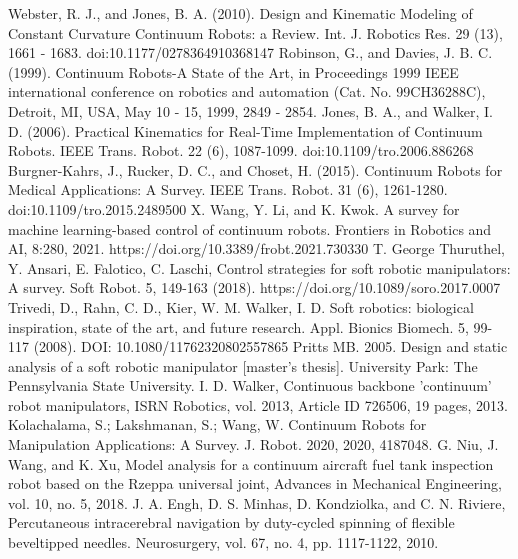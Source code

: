 \documentclass[12pt,twoside,a4]{mwbk}
\begin{document}
\begin{thebibliography}{9}
 Webster, R. J., and Jones, B. A. (2010). Design and Kinematic Modeling of Constant Curvature Continuum Robots: a Review. Int. J. Robotics Res. 29 (13), 1661 - 1683. doi:10.1177/0278364910368147
 Robinson, G., and Davies, J. B. C. (1999). Continuum Robots-A State of the Art, in Proceedings 1999 IEEE international conference on robotics and automation (Cat. No. 99CH36288C), Detroit, MI, USA, May 10 - 15, 1999, 2849 - 2854.
 Jones, B. A., and Walker, I. D. (2006). Practical Kinematics for Real-Time Implementation of Continuum Robots. IEEE Trans. Robot. 22 (6), 1087-1099. doi:10.1109/tro.2006.886268
 Burgner-Kahrs, J., Rucker, D. C., and Choset, H. (2015). Continuum Robots for Medical Applications: A Survey. IEEE Trans. Robot. 31 (6), 1261-1280. doi:10.1109/tro.2015.2489500
 X. Wang, Y. Li, and K. Kwok. A survey for machine learning-based control of continuum robots. Frontiers in Robotics and AI, 8:280, 2021. https://doi.org/10.3389/frobt.2021.730330
 T. George Thuruthel, Y. Ansari, E. Falotico, C. Laschi, Control strategies for soft robotic manipulators: A survey. Soft Robot. 5, 149-163 (2018). https://doi.org/10.1089/soro.2017.0007
 Trivedi, D., Rahn, C. D., Kier, W. M. Walker, I. D. Soft robotics: biological inspiration, state of the art, and future research. Appl. Bionics Biomech. 5, 99-117 (2008). DOI: 10.1080/11762320802557865
 Pritts MB. 2005. Design and static analysis of a soft robotic manipulator [master's thesis]. University Park: The Pennsylvania State University.
 I. D. Walker, Continuous backbone 'continuum' robot manipulators, ISRN Robotics, vol. 2013, Article ID 726506, 19 pages, 2013.
 Kolachalama, S.; Lakshmanan, S.; Wang, W. Continuum Robots for Manipulation Applications: A Survey. J. Robot. 2020, 2020, 4187048.
 G. Niu, J. Wang, and K. Xu, Model analysis for a continuum aircraft fuel tank inspection robot based on the Rzeppa universal joint, Advances in Mechanical Engineering, vol. 10, no. 5, 2018.
 J. A. Engh, D. S. Minhas, D. Kondziolka, and C. N. Riviere, Percutaneous intracerebral navigation by duty-cycled spinning of flexible beveltipped needles. Neurosurgery, vol. 67, no. 4, pp. 1117-1122, 2010.

\end{thebibliography}
\end{document}
